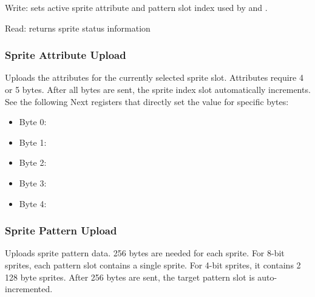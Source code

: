 Write: sets active sprite attribute and pattern slot index used by  and .

\begin{NextPort}
\end{NextPort}

Read: returns sprite status information

\begin{NextPort}
\end{NextPort}


\subsubsection{Sprite Attribute Upload }

Uploads the attributes for the currently selected sprite slot. Attributes require 4 or 5 bytes. After all bytes are sent, the sprite index slot automatically increments. See the following Next registers that directly set the value for specific bytes:

\begin{itemize}[topsep=1pt,itemsep=1pt]
	\item Byte 0: 
	\item Byte 1: 
	\item Byte 2: 
	\item Byte 3: 
	\item Byte 4: 
\end{itemize}


\subsubsection{Sprite Pattern Upload }

Uploads sprite pattern data. 256 bytes are needed for each sprite. For 8-bit sprites, each pattern slot contains a single sprite. For 4-bit sprites, it contains 2 128 byte sprites. After 256 bytes are sent, the target pattern slot is auto-incremented.

